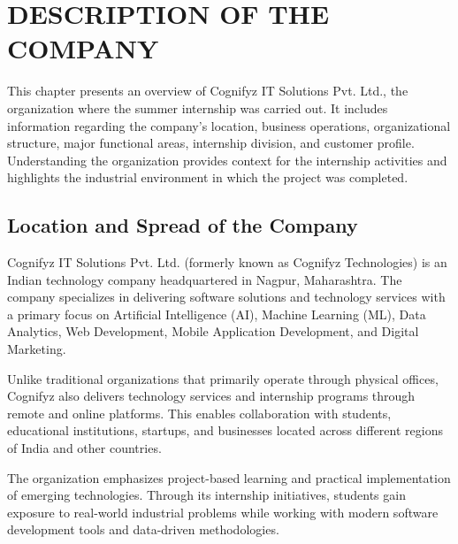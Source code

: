 \documentclass[12pt,a4paper]{report}
\begin{document}
\listoftables

\newpage



\chapter{DESCRIPTION OF THE COMPANY}

This chapter presents an overview of Cognifyz IT Solutions Pvt. Ltd., the organization where the summer internship was carried out. It includes information regarding the company's location, business operations, organizational structure, major functional areas, internship division, and customer profile. Understanding the organization provides context for the internship activities and highlights the industrial environment in which the project was completed.


\section{Location and Spread of the Company}

Cognifyz IT Solutions Pvt. Ltd. (formerly known as Cognifyz Technologies) is an Indian technology company headquartered in Nagpur, Maharashtra. The company specializes in delivering software solutions and technology services with a primary focus on Artificial Intelligence (AI), Machine Learning (ML), Data Analytics, Web Development, Mobile Application Development, and Digital Marketing.

Unlike traditional organizations that primarily operate through physical offices, Cognifyz also delivers technology services and internship programs through remote and online platforms. This enables collaboration with students, educational institutions, startups, and businesses located across different regions of India and other countries.

The organization emphasizes project-based learning and practical implementation of emerging technologies. Through its internship initiatives, students gain exposure to real-world industrial problems while working with modern software development tools and data-driven methodologies.
\end{document}
